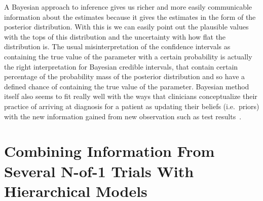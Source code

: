 \documentclass[12pt,a4paper,leqno]{report}
\theoremstyle{plain}
\theoremstyle{definition}
\theoremstyle{remark}
\begin{document}
A Bayesian approach to inference gives us richer and more easily communicable
information about the estimates because it gives the estimates in the form of the
posterior distribution. With this is we can easily point out the plausible values
with the tops of this distribution and the uncertainty with how flat the
distribution is. The usual misinterpretation of the confidence intervals as
containing the true value of the parameter with a certain probability is actually
the right interpretation for Bayesian credible intervals, that contain certain
percentage of the probability mass of the posterior distribution and so have a
defined chance of containing the true value of the parameter. Bayesian method itself
also seems to fit really well with the ways that clinicians conceptualize
their practice of arriving at diagnosis for a patient as updating their beliefs
(i.e.\ priors) with the new information gained from new observation such as test
results\ \cite{clinbayes}.

\chapter{Combining Information From Several N-of-1 Trials With Hierarchical Models}\label{hierarchicalbayes}
\end{document}
